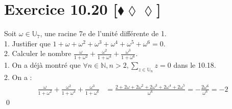 \documentclass[10pt]{article}
\begin{document}

\section*{Exercice 10.20 [$\blacklozenge\lozenge\lozenge$]}
\begin{tcolorbox}[enhanced, width=7in, center, size=fbox, fontupper=\large, drop shadow southwest]
    Soit $\omega\in\mathbb{U}_7$, une racine 7e de l'unité différente de 1.\\
    1. Justifier que $1+\omega+\omega^2+\omega^3+\omega^4+\omega^5+\omega^6=0$.\\
    2. Calculer le nombre $\frac{\omega}{1+\omega^2} + \frac{\omega^2}{1+\omega^4} + \frac{\omega^3}{1+\omega^6}$.\\[0.2cm]
    1. On a déjà montré que $\forall{n\in\mathbb{N}},n>2,\sum\limits_{z\in\mathbb{U}_n}z=0$ dans le 10.18.\\
    2. On a :
    \begin{align*}
        \frac{\omega}{1+\omega^2} + \frac{\omega^2}{1+\omega^4} + \frac{\omega^3}{1+\omega^6} &=
        \frac{2+2\omega+2\omega^2+2\omega^3+2\omega^4+2\omega^5}{\omega^6}=-\frac{2\omega^6}{\omega^6}=-2
    \end{align*}
    \qed
\end{tcolorbox}

\end{document}
